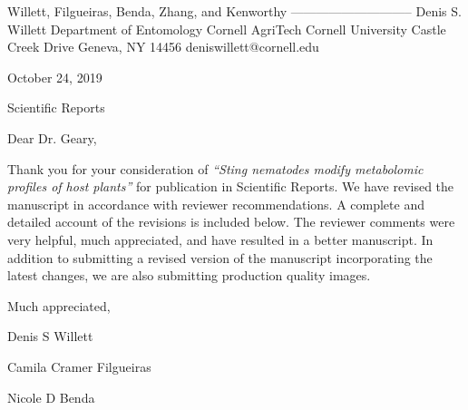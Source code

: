 \documentclass{article}
\begin{document}
\begin{addmargin}[2.8in]{}
Willett, Filgueiras, \newline
Benda, Zhang, and Kenworthy \newline
----------------------------- \newline
Denis S. Willett\newline
Department of Entomology \newline
Cornell AgriTech  \newline
Cornell University  Castle Creek Drive \newline
Geneva, NY 14456 \newline
deniswillett@cornell.edu \newline
\end{addmargin}
\setlength{\parindent}{0cm}

October 24, 2019

\vspace{1.24em}

Scientific Reports

\vspace{1.24em}

Dear Dr. Geary,

\vspace{0.48em}
\setlength{\parindent}{1.24cm}

Thank you for your consideration of \textit{“Sting nematodes modify metabolomic profiles of host plants”} for publication in Scientific Reports.  We have revised the manuscript in accordance with reviewer recommendations.  A complete and detailed account of the revisions is included below.  The reviewer comments were very helpful, much appreciated, and have resulted in a better manuscript.  In addition to submitting a revised version of the manuscript incorporating the latest changes, we are also submitting production quality images.  
  

\vspace{2em}

Much appreciated, \newline

\vspace{1em}

Denis S Willett
\vspace{0.48em}

Camila Cramer Filgueiras
\vspace{0.48em}

Nicole D Benda
\vspace{0.48em}
\end{document}
